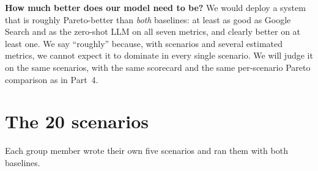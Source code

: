\documentclass[11pt]{article}
\newcommand{\lead}[1]{{\sffamily\bfseries\color{accent}#1}\hspace{0.5em}}
\begin{document}
\lead{How much better does our model need to be?}
We would deploy a system that is roughly Pareto-better than \emph{both} baselines:
at least as good as Google Search and as the zero-shot LLM on all seven metrics, and clearly better on at least one.
We say ``roughly'' because, with \NScenarios{} scenarios and several estimated metrics,
we cannot expect it to dominate in every single scenario.
We will judge it on the same scenarios, with the same scorecard and the same per-scenario Pareto comparison as in Part~4.

\clearpage
\appendix
\titleformat{\section}{\sffamily\bfseries\Large\color{ink}}{\textcolor{accent}{Appendix \thesection}}{0.6em}{}
\section{The 20 scenarios}
\label{app:scenarios}

Each group member wrote their own five scenarios and ran them with both baselines.
\end{document}
